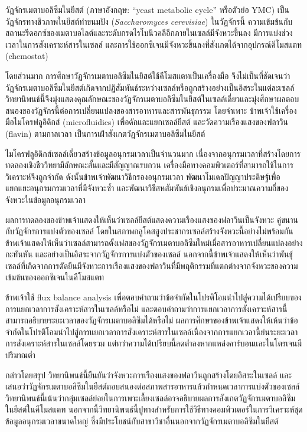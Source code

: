 \documentclass[12pt]{extarticle}
\begin{document}

วัฏจักรเมตาบอลิซึมในยีสต์ (ภาษาอังกฤษ: ``yeast metabolic cycle'' หรือตัวย่อ YMC) เป็นวัฏจักรทางชีวภาพในยีสต์ทำขนมปัง (\textit{Saccharomyces cerevisiae}) ในวัฏจักรนี้ ความเข้มข้นกับสถานะรีดอกซ์ของเมตาบอไลต์และระดับกรดไรโบนิวคลีอีกภายในเซลล์มีจังหวะขึ้นลง มีการแบ่งช่วงเวลาในการสังเคราะห์สารในเซลล์ และการใช้ออกซิเจนมีจังหวะขึ้นลงที่สังเกตได้จากอุปกรณ์คีโมสแตท (chemostat)

โดยส่วนมาก การศึกษาวัฏจักรเมตาบอลิซึมในยีสต์ใช้คีโมสแตทเป็นเครื่องมือ จึงไม่เป็นที่ชัดเจนว่าวัฏจักรเมตาบอลิซึมในยีสต์เกิดจากปฏิสัมพันธ์ระหว่างเซลล์หรือถูกสร้างอย่างเป็นอิสระในแต่ละเซลล์ วิทยานิพนธ์นี้จึงมุ่งแสดงคุณลักษณะของวัฏจักรเมตาบอลิซึมในยีสต์ในเซลล์เดี่ยวและมุ่งศึกษาผลตอบสนองของวัฏจักรนี้ต่อการเปลี่ยนแปลงของสารอาหารและสารพันธุกรรม โดยจำเพาะ ข้าพเจ้าใช้เครื่องมือไมโครฟลูอิดิกส์ (microfluidics) เพื่อดักและแยกเซลล์ยีสต์ และวัดความเรืองแสงของฟลาวิน (flavin) ตามกาลเวลา เป็นการเฝ้าสังเกตวัฏจักรเมตาบอลิซึมในยีสต์

ไมโครฟลูอิดิกส์เซลล์เดี่ยวสร้างข้อมูลอนุกรมเวลาเป็นจำนวนมาก เนื่องจากอนุกรมเวลาที่สร้างโดยการทดลองเชิงชีววิทยามีลักษณะสั้นและมีสัญญาณรบกวน เครื่องมือทางคอมพิวเตอร์ที่สามารถใช้ในการวิเคราะห์จึงถูกจำกัด ดังนั้นข้าพเจ้าพัฒนาวิธีกรองอนุกรมเวลา พัฒนาโมเดลปัญญาประดิษฐ์เพื่อแยกแยะอนุกรมกรมเวลาที่มีจังหวะซ้ำ และพัฒนาวิธีสหสัมพันธ์เชิงอนุกรมเพื่อประมาณความถี่ของจังหวะในข้อมูลอนุกรมเวลา

ผลการทดลองของข้าพเจ้าแสดงให้เห็นว่าเซลล์ยีสต์แสดงความเรืองแสงของฟลาวินเป็นจังหวะ คู่ขนานกับวัฏจักรการแบ่งตัวของเซลล์ โดยในสภาพกลูโคสสูงประชากรเซลล์สร้างจังหวะนี้อย่างไม่พร้อมกัน ข้าพเจ้าแสดงให้เห็นว่าเซลล์สามารถตั้งเฟสของวัฏจักรเมตาบอลิซึมใหม่เมื่อสารอาหารเปลี่ยนแปลงอย่างกะทันหัน และอย่างเป็นอิสระจากวัฏจักรการแบ่งตัวของเซลล์ นอกจากนี้ข้าพเจ้าแสดงให้เห็นว่าพันธุ์เซลล์ที่เกิดจากการตัดยีนมีจังหวะการเรืองแสงของฟลาวินที่มีพฤติกรรมที่แตกต่างจากจังหวะของความเข้มข้นของออกซิเจนในคีโมสแตท

ข้าพเจ้าใช้ flux balance analysis เพื่อตอบคำถามว่าข้อจำกัดในโปรติโอมนำไปสู่ความได้เปรียบของการแยกเวลาการสังเคราะห์สารในเซลล์หรือไม่ และตอบคำถามว่าการแยกเวลาการสังเคราะห์สารนี้สามารถอธิบายระยะเวลาของวัฏจักรเมตาบอลิซึมได้หรือไม่ ผลการศึกษาของข้าพเจ้าแสดงให้เห้นว่าข้อจำกัดในโปรติโอมนำไปสู่การแยกเวลาการสังเคราะห์สารในเซลล์เนื่องจากการแยกเวลานี้ย่นระยะเวลาการสังเคราะห์สารในเซลล์โดยรวม แต่ทว่าความได้เปรียบนี้ลดต่ำลงหากแหล่งคาร์บอนและไนโตรเจนมีปริมาณต่ำ

กล่าวโดยสรุป วิทยานิพนธ์นี้ยืนยันว่าจังหวะการเรืองแสงของฟลาวินถูกสร้างโดยอิสระในเซลล์ และเสนอว่าวัฏจักรเมตาบอลิซึมในยีสต์ตอบสนองต่อสภาพสารอาหารแล้วกำหนดเวลาการแบ่งตัวของเซลล์ วิทยานิพนธ์นี้เน้นว่ากลุ่มเซลล์ย่อยในการเพาะเลี้ยงเซลล์อาจอธิบายผลการสังเกตวัฏจักรเมตาบอลิซึมในยีสต์ในคีโมสแตท นอกจากนี้วิทยานิพนธ์นี้ปูทางสำหรับการใช้วิธีทางคอมพิวเตอร์ในการวิเคราะห์ชุดข้อมูลอนุกรมเวลาขนาดใหญ่ ซึ่งมีประโยชน์กับสาขาวิชาอื่นนอกจากวัฏจักรเมตาบอลิซึมในยีสต์
\end{document}
